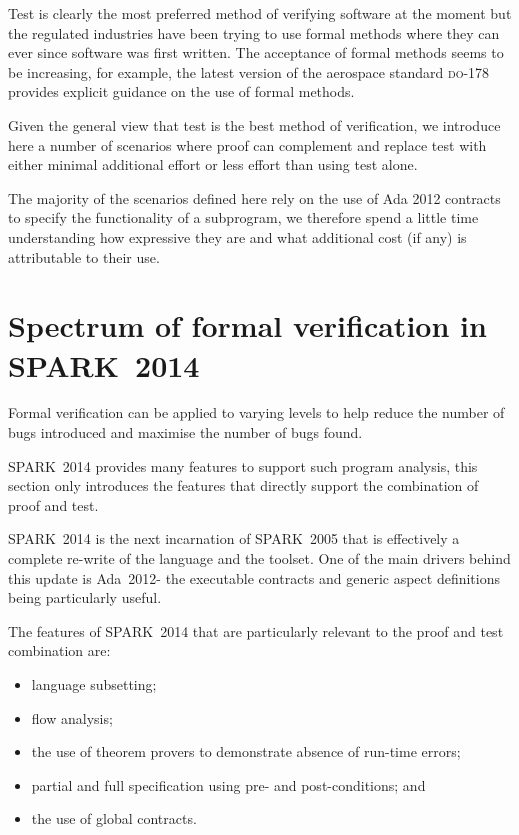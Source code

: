\documentclass{llncs} \usepackage[utf8]{inputenc} \usepackage{url}
\newcommand{\DO}{\textsc{do-178}\xspace}
\newcommand{\oldspark}{SPARK~2005\xspace}
\newcommand{\newspark}{SPARK~2014\xspace}
\newcommand{\adatwtw}{Ada~2012\xspace}
\begin{document}
Test is clearly the most preferred method of verifying software at the
moment but the regulated industries have been trying to use formal
methods where they can ever since software was first written. The
acceptance of formal methods seems to be increasing, for example, the
latest version of the aerospace standard \DO provides explicit
guidance on the use of formal methods.

Given the general view that test is the best method of verification,
we introduce here a number of scenarios where proof can complement and
replace test with either minimal additional effort or less effort than
using test alone.

The majority of the scenarios defined here rely on the use of Ada 2012
contracts to specify the functionality of a subprogram, we therefore
spend a little time understanding how expressive they are and what
additional cost (if any) is attributable to their use.


\section{Spectrum of formal verification in \newspark}

Formal verification can be applied to varying levels to help reduce
the number of bugs introduced and maximise the number of bugs found.

\newspark provides many features to support such program analysis,
this section only introduces the features that directly support the
combination of proof and test.

\newspark is the next incarnation of \oldspark \cite{sparkbook2012}
that is effectively a complete re-write of the language and the
toolset. One of the main drivers behind this update is \adatwtw - the
executable contracts and generic aspect definitions being particularly
useful.

The features of \newspark that are particularly relevant to the proof
and test combination are:
\begin{itemize}
   \item language subsetting;
   \item flow analysis;
   \item the use of theorem provers to demonstrate absence of run-time
     errors;
   \item partial and full specification using pre- and
     post-conditions; and
   \item the use of global contracts.
\end{itemize}
\end{document}
